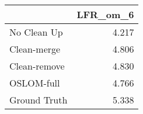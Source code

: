 \begin{tabular}{lr}
\toprule
{} & LFR_om_6 \\
\midrule
No Clean Up  &    4.217 \\
Clean-merge  &    4.806 \\
Clean-remove &    4.830 \\
OSLOM-full   &    4.766 \\
Ground Truth &    5.338 \\
\bottomrule
\end{tabular}
